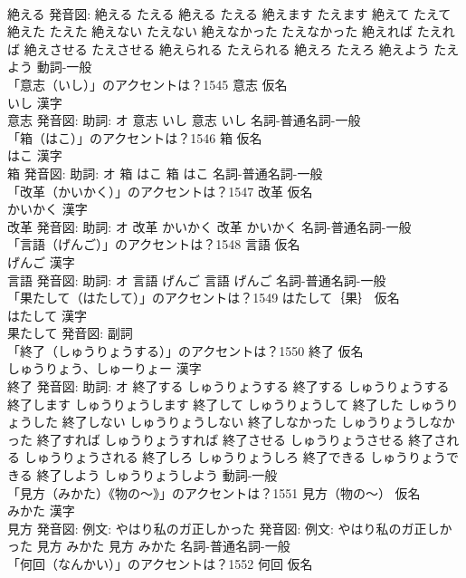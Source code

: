\documentclass[8pt]{extreport}
\begin{document}
\begin{CJK}{UTF8}{min}
\\	絶える 発音図:	絶える たえる		絶える たえる 絶えます たえます 絶えて たえて 絶えた たえた 絶えない たえない 絶えなかった たえなかった 絶えれば たえれば 絶えさせる たえさせる 絶えられる たえられる 絶えろ たえろ 絶えよう たえよう				動詞-一般 
\\	「意志（いし）」のアクセントは？1545	意志 仮名　
\\	いし 漢字　
\\	意志 発音図: 助詞: オ	意志 いし		意志 いし				名詞-普通名詞-一般 
\\	「箱（はこ）」のアクセントは？1546	箱 仮名　
\\	はこ 漢字　
\\	箱 発音図: 助詞: オ	箱 はこ		箱 はこ				名詞-普通名詞-一般 
\\	「改革（かいかく）」のアクセントは？1547	改革 仮名　
\\	かいかく 漢字　
\\	改革 発音図: 助詞: オ	改革 かいかく		改革 かいかく				名詞-普通名詞-一般 
\\	「言語（げんご）」のアクセントは？1548	言語 仮名　
\\	げんご 漢字　
\\	言語 発音図: 助詞: オ	言語 げんご		言語 げんご				名詞-普通名詞-一般 
\\	「果たして（はたして）」のアクセントは？1549	はたして｛果｝ 仮名　
\\	はたして 漢字　
\\	果たして 発音図:							副詞 
\\	「終了（しゅうりょうする）」のアクセントは？1550	終了 仮名　
\\	しゅうりょう、しゅーりょー 漢字　
\\	終了 発音図: 助詞: オ	終了する しゅうりょうする		終了する しゅうりょうする 終了します しゅうりょうします 終了して しゅうりょうして 終了した しゅうりょうした 終了しない しゅうりょうしない 終了しなかった しゅうりょうしなかった 終了すれば しゅうりょうすれば 終了させる しゅうりょうさせる 終了される しゅうりょうされる 終了しろ しゅうりょうしろ 終了できる しゅうりょうできる 終了しよう しゅうりょうしよう				動詞-一般 
\\	「見方（みかた）《物の〜》」のアクセントは？1551	見方（物の〜） 仮名　
\\	みかた 漢字　
\\	見方 発音図: 例文: やはり私のガ正しかった 発音図: 例文: やはり私のガ正しかった	見方 みかた		見方 みかた				名詞-普通名詞-一般 
\\	「何回（なんかい）」のアクセントは？1552	何回 仮名　

\end{CJK}
\end{document}
